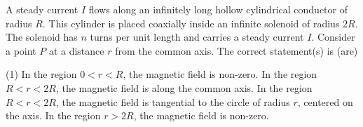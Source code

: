 
\item A steady current $I$ flows along an infinitely long hollow cylindrical conductor of radius $R$. This cylinder is placed coaxially inside an infinite solenoid of radius $2R$. The solenoid has $n$ turns per unit length and carries a steady current $I$. Consider a point $P$ at a distance $r$ from the common axis. The correct statement(s) is (are)
    \begin{tasks}(1)
        \task In the region $0 < r < R$, the magnetic field is non-zero.
        \task In the region $R < r < 2R$, the magnetic field is along the common axis.
        \task In the region $R < r < 2R$, the magnetic field is tangential to the circle of radius $r$, centered on the axis.
        \task In the region $r > 2R$, the magnetic field is non-zero.
    \end{tasks}
